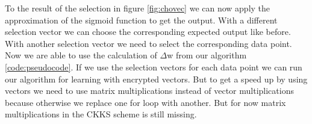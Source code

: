 \begin{text}
To the result of the selection in figure \ref{fig:chovec} we can now apply the approximation of the sigmoid function to get the output. With a different selection vector we can choose the corresponding expected output like before. With another selection vector we need to select the corresponding data point. Now we are able to use the calculation of $\Delta$w from our algorithm \ref{code:pseudocode}. \newline
If we use the selection vectors for each data point we can run our algorithm for learning with encrypted vectors. But to get a speed up by using vectors we need to use matrix multiplications instead of vector multiplications because otherwise we replace one for loop with another. But for now matrix multiplications in the CKKS scheme is still missing.
\end{text}